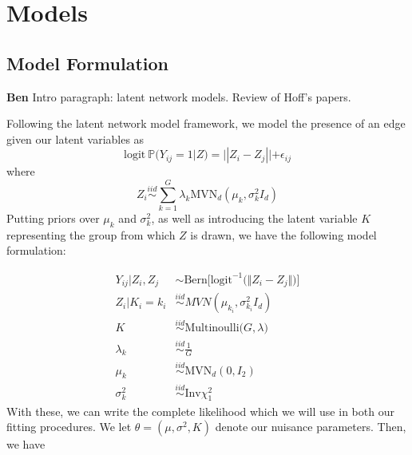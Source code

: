 \documentclass{article}
\begin{document}
\section{Models} \label{Models}


\subsection{Model Formulation}\label{Model Formulation}

\textbf{Ben} Intro paragraph: latent network models. Review of Hoff's papers. 

Following the latent network model framework, we model the presence of an edge given our latent variables as
\[\text{logit} \ \mathbb{P}(Y_{ij} = 1|Z) = ||Z_i - Z_j|| + \epsilon_{ij}\]
where
\[Z_i \overset{iid}{\sim}\sum_{k=1}^G \lambda_k\text{MVN}_d(\mu_k,\sigma_k^2I_d)\]
Putting priors over $\mu_k$ and  $\sigma_k^2$, as well as introducing the latent variable $K$ representing the group from which $Z$ is drawn, we have the following model formulation:

\begin{align*}
Y_{ij} | Z_i, Z_j &\sim \text{Bern}\Big[\text{logit}^{-1}\big(\Vert Z_i - Z_j \Vert\big)\Big] \\
Z_i | K_i = k_i &\overset{iid}\sim MVN(\mu_{k_i}, \sigma_{k_i}^2 I_d) \\
K &\overset{iid}\sim \text{Multinoulli}\big(G, \lambda \big) \\
\lambda_k &\overset{iid}\sim \frac{1}{G} \\
\mu_k &\overset{iid}\sim \text{MVN}_d(0, I_2) \\
\sigma_k^2 &\overset{iid}\sim \text{Inv} \chi^2_1
\end{align*}
With these, we can write the complete likelihood which we will use in both our fitting procedures. We let $\theta = (\mu, \sigma^2, K)$ denote our nuisance parameters. Then, we have
\end{document}
